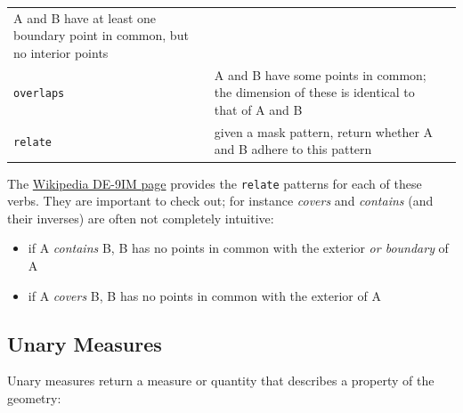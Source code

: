 \documentclass[]{book}
\providecommand{\tightlist}{%
  \setlength{\itemsep}{0pt}\setlength{\parskip}{0pt}}
\begin{document}
\begin{longtable}[]{@{}lll@{}}
\begin{minipage}[t]{0.54\columnwidth}
A and B have at least one boundary point in common, but no interior points\strut
\end{minipage} & \begin{minipage}[t]{0.13\columnwidth}\raggedright
\strut
\end{minipage}\tabularnewline
\begin{minipage}[t]{0.23\columnwidth}\raggedright
\texttt{overlaps}\strut
\end{minipage} & \begin{minipage}[t]{0.54\columnwidth}\raggedright
A and B have some points in common; the dimension of these is identical to that of A and B\strut
\end{minipage} & \begin{minipage}[t]{0.13\columnwidth}\raggedright
\strut
\end{minipage}\tabularnewline
\begin{minipage}[t]{0.23\columnwidth}\raggedright
\texttt{relate}\strut
\end{minipage} & \begin{minipage}[t]{0.54\columnwidth}\raggedright
given a mask pattern, return whether A and B adhere to this pattern\strut
\end{minipage} & \begin{minipage}[t]{0.13\columnwidth}\raggedright
\strut
\end{minipage}\tabularnewline
\bottomrule
\end{longtable}

The \href{https://en.wikipedia.org/wiki/DE-9IM}{Wikipedia DE-9IM page}
provides the \texttt{relate} patterns for each of these verbs. They are
important to check out; for instance \emph{covers} and \emph{contains} (and
their inverses) are often not completely intuitive:

\begin{itemize}
\tightlist
\item
  if A \emph{contains} B, B has no points in common with the exterior \emph{or
  boundary} of A
\item
  if A \emph{covers} B, B has no points in common with the exterior of A
\end{itemize}

\hypertarget{unary-measures}{%
\subsection{Unary Measures}\label{unary-measures}}

Unary measures return a measure or quantity that describes a property of
the geometry:
\end{document}
